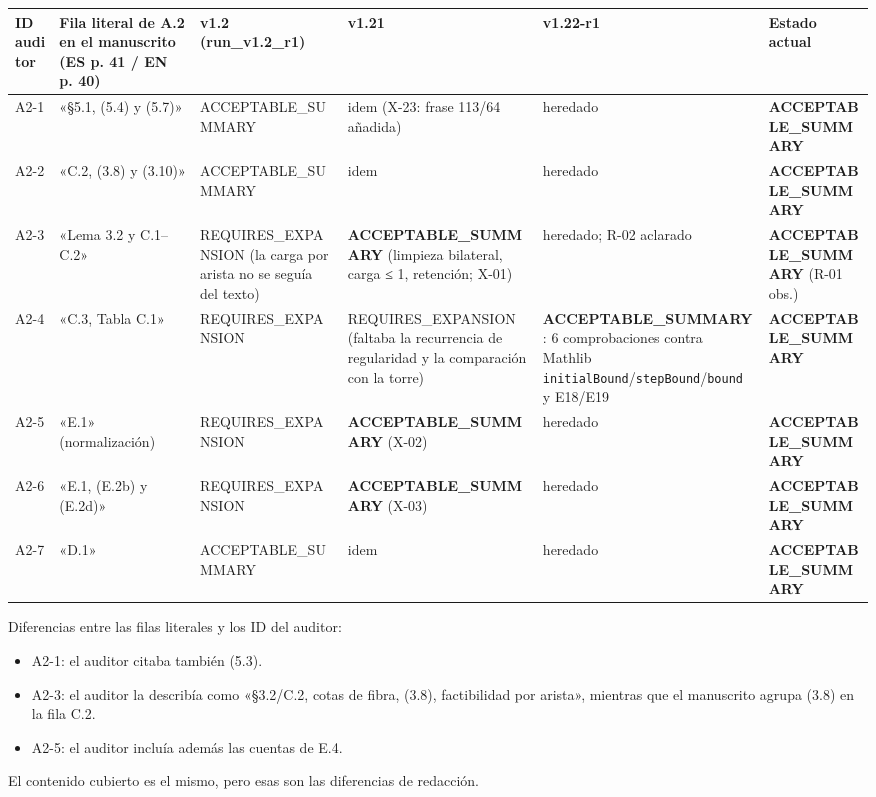 \documentclass[
]{article}
\newcounter{none} %
\providecommand{\tightlist}{%
  \setlength{\itemsep}{0pt}\setlength{\parskip}{0pt}}
\begin{document}
{\def\LTcaptype{none} %
\begin{longtable}[]{@{}llllll@{}}
\toprule\noalign{}
ID auditor & Fila literal de A.2 en el manuscrito (ES p. 41 / EN p. 40)
& v1.2 (run\_v1.2\_r1) & v1.21 & v1.22-r1 & Estado actual \\
\midrule\noalign{}
\endhead
\bottomrule\noalign{}
\endlastfoot
A2-1 & «§5.1, (5.4) y (5.7)» & ACCEPTABLE\_SUMMARY & idem (X-23: frase
113/64 añadida) & heredado & \textbf{ACCEPTABLE\_SUMMARY} \\
A2-2 & «C.2, (3.8) y (3.10)» & ACCEPTABLE\_SUMMARY & idem & heredado &
\textbf{ACCEPTABLE\_SUMMARY} \\
A2-3 & «Lema 3.2 y C.1--C.2» & REQUIRES\_EXPANSION (la carga por arista
no se seguía del texto) & \textbf{ACCEPTABLE\_SUMMARY} (limpieza
bilateral, carga ≤ 1, retención; X-01) & heredado; R-02 aclarado &
\textbf{ACCEPTABLE\_SUMMARY} (R-01 obs.) \\
A2-4 & «C.3, Tabla C.1» & REQUIRES\_EXPANSION & REQUIRES\_EXPANSION
(faltaba la recurrencia de regularidad y la comparación con la torre) &
\textbf{ACCEPTABLE\_SUMMARY}: 6 comprobaciones contra Mathlib
\texttt{initialBound}/\texttt{stepBound}/\texttt{bound} y E18/E19 &
\textbf{ACCEPTABLE\_SUMMARY} \\
A2-5 & «E.1» (normalización) & REQUIRES\_EXPANSION &
\textbf{ACCEPTABLE\_SUMMARY} (X-02) & heredado &
\textbf{ACCEPTABLE\_SUMMARY} \\
A2-6 & «E.1, (E.2b) y (E.2d)» & REQUIRES\_EXPANSION &
\textbf{ACCEPTABLE\_SUMMARY} (X-03) & heredado &
\textbf{ACCEPTABLE\_SUMMARY} \\
A2-7 & «D.1» & ACCEPTABLE\_SUMMARY & idem & heredado &
\textbf{ACCEPTABLE\_SUMMARY} \\
\end{longtable}
}

Diferencias entre las filas literales y los ID del auditor:

\begin{itemize}
\tightlist
\item
  A2-1: el auditor citaba también (5.3).
\item
  A2-3: el auditor la describía como «§3.2/C.2, cotas de fibra, (3.8),
  factibilidad por arista», mientras que el manuscrito agrupa (3.8) en
  la fila C.2.
\item
  A2-5: el auditor incluía además las cuentas de E.4.
\end{itemize}

El contenido cubierto es el mismo, pero esas son las diferencias de
redacción.
\end{document}
